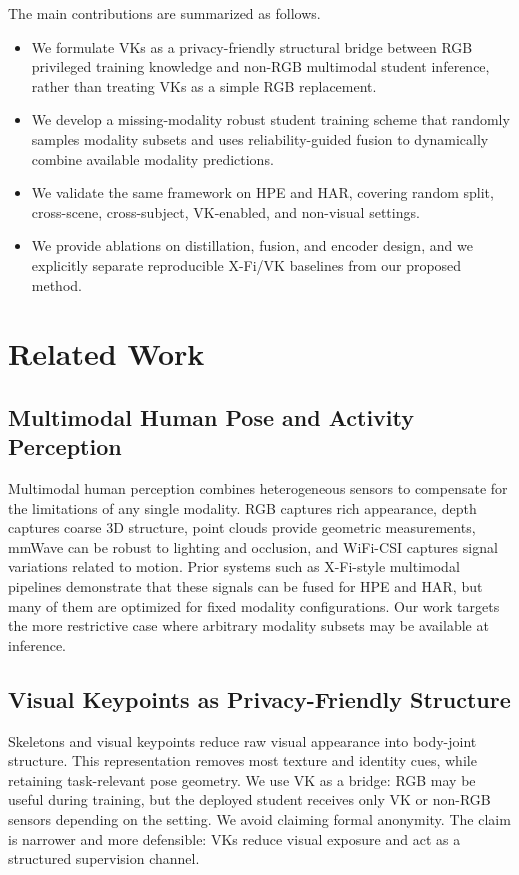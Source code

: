 \documentclass[journal]{IEEEtran}
\begin{document}
The main contributions are summarized as follows.

\begin{itemize}
    \item We formulate VKs as a privacy-friendly structural bridge between RGB privileged training knowledge and non-RGB multimodal student inference, rather than treating VKs as a simple RGB replacement.
    \item We develop a missing-modality robust student training scheme that randomly samples modality subsets and uses reliability-guided fusion to dynamically combine available modality predictions.
    \item We validate the same framework on HPE and HAR, covering random split, cross-scene, cross-subject, VK-enabled, and non-visual settings.
    \item We provide ablations on distillation, fusion, and encoder design, and we explicitly separate reproducible X-Fi/VK baselines from our proposed method.
\end{itemize}

\section{Related Work}

\subsection{Multimodal Human Pose and Activity Perception}
Multimodal human perception combines heterogeneous sensors to compensate for the limitations of any single modality. RGB captures rich appearance, depth captures coarse 3D structure, point clouds provide geometric measurements, mmWave can be robust to lighting and occlusion, and WiFi-CSI captures signal variations related to motion. Prior systems such as X-Fi-style multimodal pipelines demonstrate that these signals can be fused for HPE and HAR, but many of them are optimized for fixed modality configurations. Our work targets the more restrictive case where arbitrary modality subsets may be available at inference.

\subsection{Visual Keypoints as Privacy-Friendly Structure}
Skeletons and visual keypoints reduce raw visual appearance into body-joint structure. This representation removes most texture and identity cues, while retaining task-relevant pose geometry. We use VK as a bridge: RGB may be useful during training, but the deployed student receives only VK or non-RGB sensors depending on the setting. We avoid claiming formal anonymity. The claim is narrower and more defensible: VKs reduce visual exposure and act as a structured supervision channel.
\end{document}
